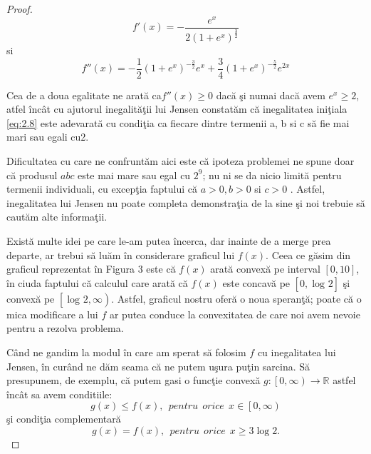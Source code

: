 \documentclass[a4paper,12pt,oneside]{report}
\begin{document}
\begin{proof}
\begin{displaymath}
  {f}'\left ( x \right ) = -\frac{e^{x}}{2 \left ( 1 + e^{x} \right )^{\frac{3}{2}}}
\end{displaymath}
si
\begin{displaymath}
  {f}''\left ( x \right ) = -\frac{1}{2}\left (  1 + e^{x} \right )^{-\frac{3}{2}}e^{x} + \frac{3}{4}\left ( 1 + e^{x} \right )^{-\frac{5}{2}}e^{2x}
\end{displaymath}

Cea de a doua egalitate ne arat\u{a} ca\({f}''\left ( x \right ) \geq 0\) dac\u{a} \c{s}i numai dac\u{a} avem \(e^{x}\geq 2\), atfel \^{i}nc\^{a}t cu ajutorul inegalit\u{a}\c{t}ii lui Jensen  constat\u{a}m c\u{a} inegalitatea ini\c{t}iala \ref{eq:2.8}  este adevarat\u{a} cu condi\c{t}ia ca fiecare dintre termenii a, b si c s\u{a} fie mai mari sau egali cu2.

Dificultatea cu care ne confrunt\u{a}m aici este c\u{a} ipoteza problemei  ne spune doar  c\u{a} produsul \(abc\) este mai mare sau egal cu \(2^{9}\); nu ni se da nicio  limit\u{a} pentru termenii  individuali, cu excep\c{t}ia faptului c\u{a} \( a > 0, b > 0 \) si \(c > 0\) . Astfel, inegalitatea lui Jensen nu poate completa demonstra\c{t}ia de la sine \c{s}i noi trebuie s\u{a} caut\u{a}m alte informa\c{t}ii.

Exist\u{a} multe idei pe care le-am putea \^{i}ncerca, dar inainte de a merge prea departe,  ar trebui s\u{a} lu\u{a}m \^{i}n considerare graficul lui \(f\left ( x \right )\). Ceea ce  g\u{a}sim  din graficul  reprezentat \^{i}n Figura 3 este c\u{a} \(f\left ( x \right ) \) arat\u{a} convex\u{a} pe interval \(\left [ 0, 10 \right ]  \), \^{i}n ciuda faptului c\u{a} calculul care arat\u{a} c\u{a} \(f\left ( x \right ) \) este concav\u{a} pe \(\left [ 0, \log _{} 2\right ] \) \c{s}i convex\u{a} pe \(\left [ \log _{} 2 , \infty \right ) \). Astfel, graficul nostru ofer\u{a} o noua speran\c{t}\u{a}; poate c\u{a} o mica modificare a lui \(f\) ar putea conduce la convexitatea de care noi avem nevoie pentru a rezolva problema.

C\^{a}nd ne gandim la modul \^{i}n care am sperat s\u{a} folosim \(f\) cu inegalitatea lui Jensen, \^{i}n cur\^{a}nd ne d\u{a}m seama c\u{a} ne putem u\c{s}ura pu\c{t}in sarcina. S\u{a} presupunem, de exemplu, c\u{a} putem gasi o func\c{t}ie convex\u{a} \(g : \left [ 0 , \infty  \right ) \to \mathbb{R}\) astfel \^{i}nc\^{a}t sa avem  conditiile:
\begin{displaymath}
  g\left ( x \right ) \leq  f\left ( x  \right ),~~ pentru~~ orice~~ x \in  \left [ 0 , \infty  \right )    \label{eq:2.9} \tag{2.9}
\end{displaymath}
\c{s}i condi\c{t}ia complementar\u{a}
\begin{displaymath}
  g \left ( x \right ) = f \left ( x \right ), ~~pentru~~ orice~~  x\geq 3 \log 2. \label{eq:2.10} \tag{2.10}
\end{displaymath}


\end{proof}
\end{document}
